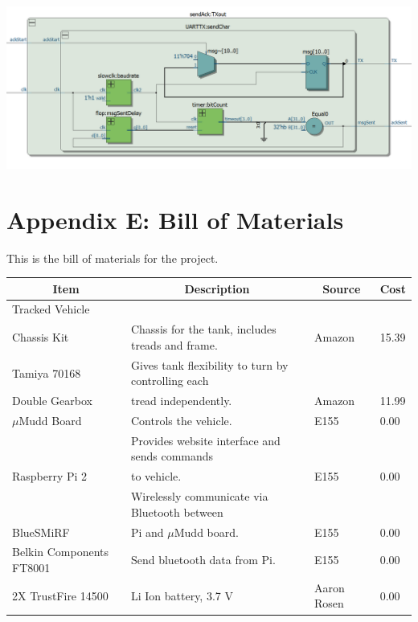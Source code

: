 \documentclass[11pt]{article}
\begin{document}
\begin{center}
\includegraphics[width=\textwidth]{sendAck}
\end{center}

\section{Appendix E: Bill of Materials}
This is the bill of materials for the project.

\centering
\begin{tabular}{|l|l|l|l|}
\hline
\multicolumn{1}{|c|}{\textbf{Item}} & \multicolumn{1}{c|}{\textbf{Description}}               	& \multicolumn{1}{c|}{\textbf{Source}} & \multicolumn{1}{c|}{\textbf{Cost}} \\ \hline
Tracked Vehicle 			&										&							&	\\
			Chassis Kit	& Chassis for the tank, includes treads and frame.    	& Amazon 					& 15.39                          	\\ \hline
Tamiya 70168				& Gives tank flexibility to turn by controlling each     	& 							& \\
Double Gearbox			& tread independently.						& Amazon		               			& 11.99                             	\\ \hline
$\mu$Mudd Board                	& Controls the vehicle.                                                & E155                                 		& 0.00                               	\\ \hline
			                      	& Provides website interface and sends commands 	&							&\\
Raspberry Pi 2			    	& to vehicle.             							& E155                                 		& 0.00                               	\\ \hline
                        				& Wirelessly communicate via Bluetooth between  	&							&\\
BlueSMiRF				& Pi and $\mu$Mudd board.		 			& E155                                		& 0.00                               	\\ \hline
Belkin Components FT8001	& Send bluetooth data from Pi.					& E155                                		& 0.00                               	\\ \hline
2X TrustFire 14500			& Li Ion battery, 3.7 V 						& Aaron Rosen					& 0.00				\\ \hline
\end{tabular}
\end{document}
